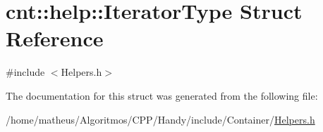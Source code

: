 \hypertarget{structcnt_1_1help_1_1IteratorType}{}\section{cnt\+:\+:help\+:\+:Iterator\+Type Struct Reference}
\label{structcnt_1_1help_1_1IteratorType}


{\ttfamily \#include $<$Helpers.\+h$>$}



The documentation for this struct was generated from the following file\+:\begin{DoxyCompactItemize}
\item 
/home/matheus/\+Algoritmos/\+C\+P\+P/\+Handy/include/\+Container/\hyperlink{Container_2Helpers_8h}{Helpers.\+h}\end{DoxyCompactItemize}
